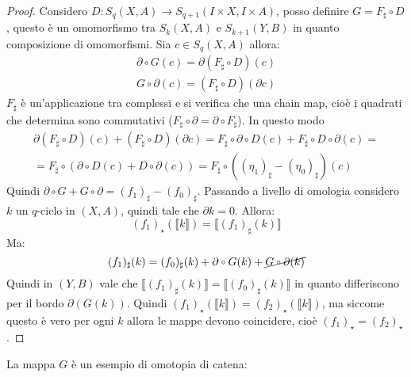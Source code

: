 \begin{proof}
  Considero $ D \colon S_q(X,A) \to S_{q+1}(I \times X, I \times A) $, posso definire
  $ G = F_\sharp \circ D $, questo è un omomorfismo tra $ S_k(X,A) $ e
  $ S_{k+1}(Y,B) $ in quanto composizione di omomorfismi.
  Sia $ c \in S_q(X,A) $ allora:
  \begin{gather*}
    \partial \circ G (c) = \partial (F_\sharp \circ D)(c) \\
    G \circ \partial (c) = (F_\sharp \circ D)(\partial c)
  \end{gather*}
  $ F_\sharp $ è un'applicazione tra complessi e si verifica che una chain map, cioè
  i quadrati che determina sono commutativi ($ F_\sharp \circ \partial = \partial \circ F_\sharp $). In questo modo
  \begin{gather*}
    \partial (F_\sharp \circ D)(c) + (F_\sharp \circ D)(\partial c) = F_\sharp \circ \partial \circ D (c) + F_\sharp \circ D \circ \partial (c) = \\
    = F_\sharp \circ ( \partial \circ D (c) + D \circ \partial (c)) = F_\sharp \circ ( (\eta_1)_\sharp - (\eta_0)_\sharp) (c)
  \end{gather*}
  Quindi $ \partial \circ G + G \circ \partial = (f_1)_\sharp - (f_0)_\sharp $.
  Passando a livello di omologia considero $ k $ un $ q $-ciclo in $ (X,A) $, quindi
  tale che $ \partial k = 0 $. Allora:
  \[
    (f_1)_\star(\llbracket k \rrbracket) = \llbracket(f_1)_\sharp(k)\rrbracket
  \]
  Ma:
  \[
    (f_1)_\sharp(k) = (f_0)_\sharp (k) + \partial \circ G (k) + \cancel{G \circ \partial (k)}
  \]
  Quindi in $ (Y,B) $ vale che
  $ \llbracket(f_1)_\sharp(k)\rrbracket = \llbracket(f_0)_\sharp(k)\rrbracket $ in quanto differiscono per il bordo
  $ \partial(G(k)) $. Quindi
  $ (f_1)_\star(\llbracket k \rrbracket) = (f_2)_\star(\llbracket k \rrbracket) $, ma siccome questo è vero per ogni
  $ k $ allora le mappe devono coincidere, cioè $ (f_1)_\star = (f_2)_\star $.
\end{proof}
\eproof
La mappa $ G $ è un esempio di omotopia di catena:

